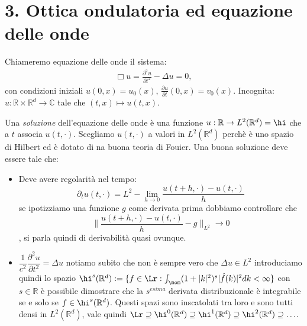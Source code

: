 \section*{3. Ottica ondulatoria ed equazione delle onde}

\begin{definition}
Chiameremo equazione delle onde il sistema: 
    \begin{align*}
        \Box u = \frac{\partial^2 u}{\partial t^2} - \Delta u = 0,
    \end{align*}
    con condizioni iniziali $u(0, x) = u_0(x)$, $\frac{\partial u}{\partial t}(0, x) = v_0(x)$.
Incognita: $u: \mathbb{R}\times \mathbb{R}^d \to \mathbb{C}$ tale che $(t,x) \mapsto u(t, x)$.
\end{definition}

Una \emph{soluzione} dell'equazione delle onde è una funzione $u: \mathbb{R} \to L^2(\mathbb{R}^d) = \hi$ che a $t$ associa $u(t, \cdot)$. Scegliamo $u(t, \cdot)$ a valori in $L^2(\mathbb{R}^d)$ perchè è uno spazio di Hilbert ed è dotato di na buona teoria di Fouier. Una buona soluzione deve essere tale che: 
\begin{itemize}
    \item Deve avere regolarità nel tempo: $$ \partial_t u(t, \cdot) = L^2 -\lim_{h \to 0} \frac{u(t+h, \cdot) - u(t, \cdot)}{h}$$ se ipotizziamo una funzione $g$ come derivata prima dobbiamo controllare che $$ \| \frac{u(t+h , \cdot )- u (t,\cdot)}{h} - g \|_{L^2} \to 0 $$, si parla quindi di derivabilità quasi ovunque.
    \item $\dfrac{1}{c^2}\dfrac{\partial^2 u}{\partial t^2} = \Delta u$ notiamo subito che non è sempre vero che $\Delta u \in L^2$ introduciamo quindi lo spazio $\hi^s(\mathbb{R}^d):= \{ f \in \Lr : \int_{\mom}(1 + |k|^2)^s |\hat{f}(k)|^2 dk < \infty \}$ con $s \in \mathbb{R}$ è possibile dimostrare che la $s^{esima}$ derivata distribuzionale è integrabile se e solo se $f \in \hi^s(\mathbb{R}^d)$. Questi spazi sono inscatolati tra loro e sono tutti densi in $L^2(\mathbb{R}^d)$, vale quindi $\Lr \supseteq \hi^0(\mathbb{R}^d) \supseteq \hi^1(\mathbb{R}^d) \supseteq \hi^2(\mathbb{R}^d) \supseteq \ldots$.
    
\end{itemize}

